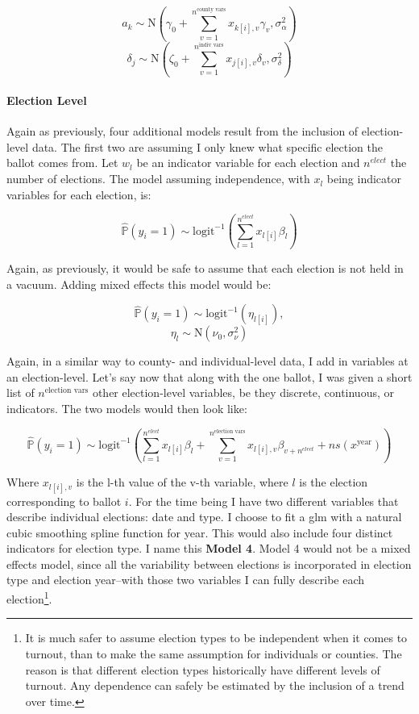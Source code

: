 \documentclass[]{article}
\let\oldparagraph\paragraph
\renewcommand{\paragraph}[1]{\oldparagraph{#1}\mbox{}}
\let\rmarkdownfootnote\footnote%
\def\footnote{\protect\rmarkdownfootnote}
\begin{document}
\[a_{k} \sim \text{N}(\gamma_0 + \sum_{v=1}^{n^{\text{county vars}}}x_{k[i], v}\gamma_{v}, \sigma_{\alpha}^2)\]
\[\delta_{j} \sim \text{N}(\zeta_0 + \sum_{v=1}^{n^{\text{indiv vars}}}x_{j[i], v}\delta_{v}, \sigma_{\delta}^2)\]

\paragraph{Election Level}\label{election-level}

Again as previously, four additional models result from the inclusion of
election-level data. The first two are assuming I only knew what
specific election the ballot comes from. Let \(w_{l}\) be an indicator
variable for each election and \(n^{elect}\) the number of elections.
The model assuming independence, with \(x_{l}\) being indicator
variables for each election, is:

\[\hat{\mathbb{P}}(y_i = 1) \sim \text{logit}^{-1}(\sum_{l = 1}^{n^{elect}}x_{l[i]}\beta_{l})\]

Again, as previously, it would be safe to assume that each election is
not held in a vacuum. Adding mixed effects this model would be:

\[\hat{\mathbb{P}}(y_i = 1) \sim \text{logit}^{-1}(\eta_{l[i]}), \]
\[\eta_{l} \sim \text{N}(\nu_0, \sigma_{\nu}^2)\]

Again, in a similar way to county- and individual-level data, I add in
variables at an election-level. Let's say now that along with the one
ballot, I was given a short list of \(n^{\text{election vars}}\) other
election-level variables, be they discrete, continuous, or indicators.
The two models would then look like:

\begin{equation} \tag{Model 4}
\hat{\mathbb{P}}(y_i = 1) \sim \text{logit}^{-1}(\sum_{l = 1}^{n^{elect}}x_{l[i]}\beta_{l} + \sum_{v=1}^{n^{\text{election vars}}}x_{l[i], v}\beta_{v+n^{elect}} + ns(x^{\text{year}}))
\end{equation}

Where \(x_{l[i], v}\) is the l-th value of the v-th variable, where
\(l\) is the election corresponding to ballot \(i\). For the time being
I have two different variables that describe individual elections: date
and type. I choose to fit a glm with a natural cubic smoothing spline
function for year. This would also include four distinct indicators for
election type. I name this \textbf{Model 4}. Model 4 would not be a
mixed effects model, since all the variability between elections is
incorporated in election type and election year--with those two
variables I can fully describe each election\footnote{It is much safer
  to assume election types to be independent when it comes to turnout,
  than to make the same assumption for individuals or counties. The
  reason is that different election types historically have different
  levels of turnout. Any dependence can safely be estimated by the
  inclusion of a trend over time.}.
\end{document}
